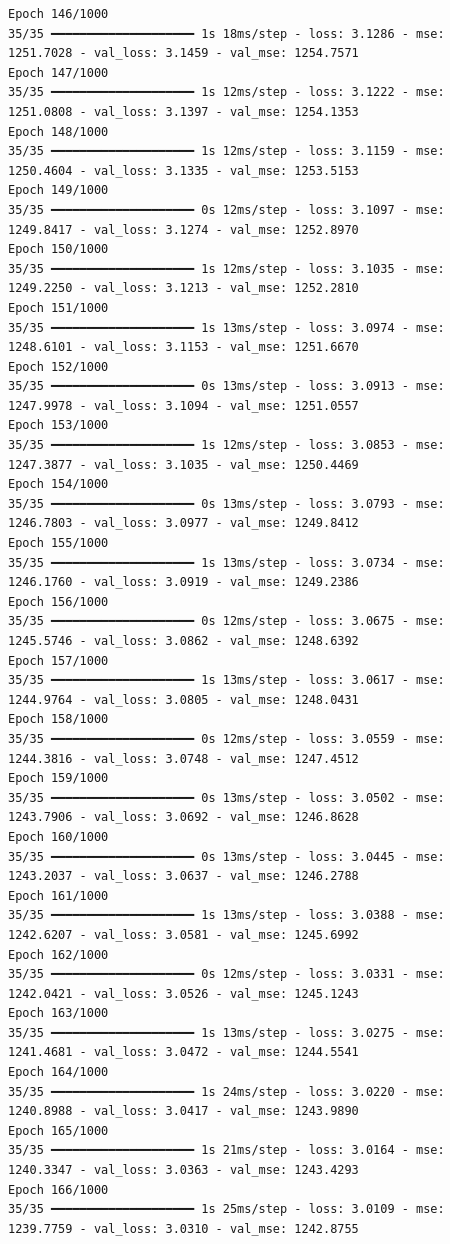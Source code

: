\documentclass[
  letterpaper,
  DIV=11,
  numbers=noendperiod]{scrreprt}
\begin{document}
\begin{verbatim}
Epoch 146/1000
35/35 ━━━━━━━━━━━━━━━━━━━━ 1s 18ms/step - loss: 3.1286 - mse: 1251.7028 - val_loss: 3.1459 - val_mse: 1254.7571
Epoch 147/1000
35/35 ━━━━━━━━━━━━━━━━━━━━ 1s 12ms/step - loss: 3.1222 - mse: 1251.0808 - val_loss: 3.1397 - val_mse: 1254.1353
Epoch 148/1000
35/35 ━━━━━━━━━━━━━━━━━━━━ 1s 12ms/step - loss: 3.1159 - mse: 1250.4604 - val_loss: 3.1335 - val_mse: 1253.5153
Epoch 149/1000
35/35 ━━━━━━━━━━━━━━━━━━━━ 0s 12ms/step - loss: 3.1097 - mse: 1249.8417 - val_loss: 3.1274 - val_mse: 1252.8970
Epoch 150/1000
35/35 ━━━━━━━━━━━━━━━━━━━━ 1s 12ms/step - loss: 3.1035 - mse: 1249.2250 - val_loss: 3.1213 - val_mse: 1252.2810
Epoch 151/1000
35/35 ━━━━━━━━━━━━━━━━━━━━ 1s 13ms/step - loss: 3.0974 - mse: 1248.6101 - val_loss: 3.1153 - val_mse: 1251.6670
Epoch 152/1000
35/35 ━━━━━━━━━━━━━━━━━━━━ 0s 13ms/step - loss: 3.0913 - mse: 1247.9978 - val_loss: 3.1094 - val_mse: 1251.0557
Epoch 153/1000
35/35 ━━━━━━━━━━━━━━━━━━━━ 1s 12ms/step - loss: 3.0853 - mse: 1247.3877 - val_loss: 3.1035 - val_mse: 1250.4469
Epoch 154/1000
35/35 ━━━━━━━━━━━━━━━━━━━━ 0s 13ms/step - loss: 3.0793 - mse: 1246.7803 - val_loss: 3.0977 - val_mse: 1249.8412
Epoch 155/1000
35/35 ━━━━━━━━━━━━━━━━━━━━ 1s 13ms/step - loss: 3.0734 - mse: 1246.1760 - val_loss: 3.0919 - val_mse: 1249.2386
Epoch 156/1000
35/35 ━━━━━━━━━━━━━━━━━━━━ 0s 12ms/step - loss: 3.0675 - mse: 1245.5746 - val_loss: 3.0862 - val_mse: 1248.6392
Epoch 157/1000
35/35 ━━━━━━━━━━━━━━━━━━━━ 1s 13ms/step - loss: 3.0617 - mse: 1244.9764 - val_loss: 3.0805 - val_mse: 1248.0431
Epoch 158/1000
35/35 ━━━━━━━━━━━━━━━━━━━━ 0s 12ms/step - loss: 3.0559 - mse: 1244.3816 - val_loss: 3.0748 - val_mse: 1247.4512
Epoch 159/1000
35/35 ━━━━━━━━━━━━━━━━━━━━ 0s 13ms/step - loss: 3.0502 - mse: 1243.7906 - val_loss: 3.0692 - val_mse: 1246.8628
Epoch 160/1000
35/35 ━━━━━━━━━━━━━━━━━━━━ 0s 13ms/step - loss: 3.0445 - mse: 1243.2037 - val_loss: 3.0637 - val_mse: 1246.2788
Epoch 161/1000
35/35 ━━━━━━━━━━━━━━━━━━━━ 1s 13ms/step - loss: 3.0388 - mse: 1242.6207 - val_loss: 3.0581 - val_mse: 1245.6992
Epoch 162/1000
35/35 ━━━━━━━━━━━━━━━━━━━━ 0s 12ms/step - loss: 3.0331 - mse: 1242.0421 - val_loss: 3.0526 - val_mse: 1245.1243
Epoch 163/1000
35/35 ━━━━━━━━━━━━━━━━━━━━ 1s 13ms/step - loss: 3.0275 - mse: 1241.4681 - val_loss: 3.0472 - val_mse: 1244.5541
Epoch 164/1000
35/35 ━━━━━━━━━━━━━━━━━━━━ 1s 24ms/step - loss: 3.0220 - mse: 1240.8988 - val_loss: 3.0417 - val_mse: 1243.9890
Epoch 165/1000
35/35 ━━━━━━━━━━━━━━━━━━━━ 1s 21ms/step - loss: 3.0164 - mse: 1240.3347 - val_loss: 3.0363 - val_mse: 1243.4293
Epoch 166/1000
35/35 ━━━━━━━━━━━━━━━━━━━━ 1s 25ms/step - loss: 3.0109 - mse: 1239.7759 - val_loss: 3.0310 - val_mse: 1242.8755

\end{verbatim}
\end{document}
